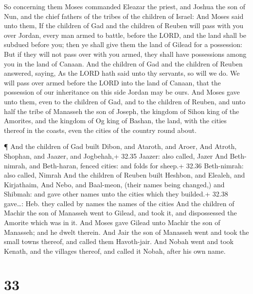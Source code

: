  So concerning them Moses commanded Eleazar the priest, and
Joshua the son of Nun, and the chief fathers of the tribes of the
children of Israel:  And Moses said unto them, If the
children of Gad and the children of Reuben will pass with you over
Jordan, every man armed to battle, before the LORD, and the land shall
be subdued before you; then ye shall give them the land of Gilead for a
possession:  But if they will not pass over with you armed,
they shall have possessions among you in the land of Canaan.
 And the children of Gad and the children of Reuben
answered, saying, As the LORD hath said unto thy servants, so will we
do.  We will pass over armed before the LORD into the land
of Canaan, that the possession of our inheritance on this side Jordan
may be ours.  And Moses gave unto them, even to the
children of Gad, and to the children of Reuben, and unto half the tribe
of Manasseh the son of Joseph, the kingdom of Sihon king of the
Amorites, and the kingdom of Og king of Bashan, the land, with the
cities thereof in the coasts, even the cities of the country round
about.

 ¶ And the children of Gad built Dibon, and Ataroth, and
Aroer,  And Atroth, Shophan, and Jaazer, and Jogbehah,+
32.35 Jaazer: also called, Jazer  And Beth-nimrah, and
Beth-haran, fenced cities: and folds for sheep.+ 32.36 Beth-nimrah: also
called, Nimrah  And the children of Reuben built Heshbon,
and Elealeh, and Kirjathaim,  And Nebo, and Baal-meon,
(their names being changed,) and Shibmah: and gave other names unto the
cities which they builded.+ 32.38 gave\ldots: Heb. they called by names
the names of the cities  And the children of Machir the son
of Manasseh went to Gilead, and took it, and dispossessed the Amorite
which was in it.  And Moses gave Gilead unto Machir the son
of Manasseh; and he dwelt therein.  And Jair the son of
Manasseh went and took the small towns thereof, and called them
Havoth-jair.  And Nobah went and took Kenath, and the
villages thereof, and called it Nobah, after his own name.

\hypertarget{section-32}{%
\section{33}\label{section-32}}


